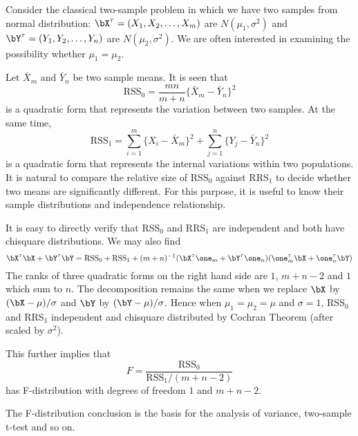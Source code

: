 \begin{example}
Consider the classical two-sample problem in which we
have two \iid samples from normal distribution:
\(
\bX^\tau = (X_1, X_2, \ldots, X_m)
\) are \iid $N(\mu_1, \sigma^2)$
and
\(
\bY^\tau = (Y_1, Y_2, \ldots, Y_n)
\) are \iid $N(\mu_2, \sigma^2)$.
We are often interested in examining the possibility 
whether $\mu_1 = \mu_2$.

Let $\bar X_m$ and $\bar Y_n$ be two sample means.
It is seen that
\[
\mbox{RSS}_0 = \frac{mn}{m+n} \{ \bar X_m - \bar Y_n\}^2
\]
is a quadratic form that represents the variation
between two samples.
At the same time,
\[
\mbox{RSS}_1 
= \sum_{i=1}^m \{X_i - \bar X_m\}^2
+
\sum_{j=1}^n \{Y_j - \bar Y_n\}^2
\]
is a quadratic form that represents the internal
variations within two populations.
It is natural to compare the relative size of RSS$_0$
against RRS$_1$ to decide whether two means are
significantly different. For this purpose,
it is useful to know their sample distributions
and independence relationship.

It is easy to directly verify that RSS$_0$
and RRS$_1$ are independent and both have
chisquare distributions. 
We may also find
\[
\bX^\tau \bX + \bY^\tau \bY
=
\mbox{RSS}_0  + \mbox{RSS}_1
+ (m+n)^{-1} (\bX^\tau \one_m + \bY^\tau \one_n) (\one_m^\tau \bX+ \one_n^\tau \bY)
\]
The ranks of three quadratic forms on the right hand side
are $1$, $m + n - 2$ and $1$
which sum to $n$. The decomposition remains the same
when we replace $\bX$ by $(\bX - \mu)/\sigma$ and $\bY$ by $(\bY - \mu)/\sigma$.
Hence when $\mu_1 = \mu_2 = \mu$ and $\sigma = 1$,
RSS$_0$ and RRS$_1$ independent and chisquare distributed
by Cochran Theorem (after scaled by $\sigma^2$).

This further implies that
\[
F = \frac{\mbox{RSS}_0 }{\mbox{RSS}_1/(m+n-2)}
\]
has F-distribution with degrees of freedom $1$ and $m+n-2$.

The F-distribution conclusion is the basis for the analysis of variance, two-sample t-test
and so on.
\end{example}


